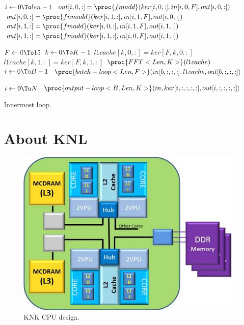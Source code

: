   \begin{algorithm}

      \begin{codebox}
        \li \For $i \gets 0 \To len-1$
        \li \Do  $out[i,0,:] = \proc{fmadd}( ker[i,0,:], in[i,0,F], out[i,0,:] )$
        \li      $out[i,0,:] = \proc{fnmadd}( ker[i,1,:], in[i,1,F], out[i,0,:] )$
        \li      $out[i,1,:] = \proc{fmadd}( ker[i,0,:], in[i,1,F], out[i,1,:] )$
        \li      $out[i,1,:] = \proc{fmadd}( ker[i,1,:], in[i,0,F], out[i,1,:] )$
        \End
      \end{codebox}

      \begin{codebox}
        \li \For $F \gets 0 \To 15$
        \li \Do  \For $k \gets 0 \To K-1$
        \li      \Do  $l1cache[k,0,:] = ker[F,k,0,:]$
        \li           $l1cache[k,1,:] = ker[F,k,1,:]$
                  \End
        \li $\proc{FFT<Len,K>}(l1cache)$
        \li \For $i \gets 0 \To B-1$
        \li \Do  $\proc{batch-loop<Len,F>}(in[b,:,:,:],l1cache,out[b,:,:,:])$
        \End
        \End
      \end{codebox}

      \begin{codebox}
        \li \For $i \gets 0 \To N$
        \li \Do  $\proc{output-loop<B,Len,K>}(in,ker[i,:,:,:,:],out[i,:,:,:,:])$
        \End
      \end{codebox}



    \caption{Innermost loop.}
  \end{algorithm}

  \section{About KNL}

  \begin{figure}
    \begin{center}
      \includegraphics[width=0.97\linewidth]{fig/knl.jpg}
    \end{center}
    \caption{KNK CPU design.}
    \label{fig:knl}
  \end{figure}



